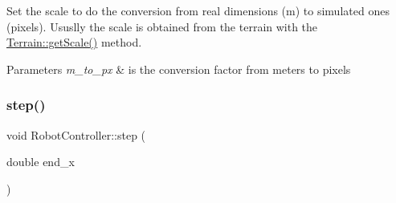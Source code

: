 Set the scale to do the conversion from real dimensions (m) to simulated ones (pixels). Ususlly the scale is obtained from the terrain with the \mbox{\hyperlink{class_terrain_af0cff27a194359a13c448c89bd374de3}{Terrain\+::get\+Scale()}} method. 
\begin{DoxyParams}{Parameters}
{\em m\+\_\+to\+\_\+px} & is the conversion factor from meters to pixels \\
\hline
\end{DoxyParams}
\mbox{\label{class_robot_controller_ab2e4091fc2e47701cc5dbd7c2d9fc649}} 
\subsubsection{\texorpdfstring{step()}{step()}}
{\footnotesize\ttfamily void Robot\+Controller\+::step (\begin{DoxyParamCaption}\item[{double}]{end\+\_\+x }\end{DoxyParamCaption})}

